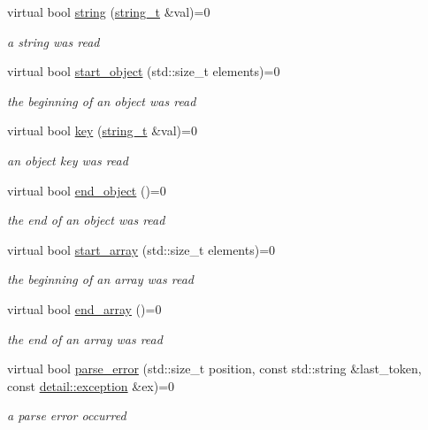 \begin{DoxyCompactItemize}
virtual bool \mbox{\hyperlink{structnlohmann_1_1json__sax_a07eab82f6c82d606787eee9ad73d2bda}{string}} (\mbox{\hyperlink{structnlohmann_1_1json__sax_ae01977a9f3c5b3667b7a2929ed91061e}{string\+\_\+t}} \&val)=0
\begin{DoxyCompactList}\small\item\em a string was read \end{DoxyCompactList}\item 
virtual bool \mbox{\hyperlink{structnlohmann_1_1json__sax_a0671528b0debb5a348169d61f0382a0f}{start\+\_\+object}} (std\+::size\+\_\+t elements)=0
\begin{DoxyCompactList}\small\item\em the beginning of an object was read \end{DoxyCompactList}\item 
virtual bool \mbox{\hyperlink{structnlohmann_1_1json__sax_a2e0c7ecd80b18d18a8cc76f71cfc2028}{key}} (\mbox{\hyperlink{structnlohmann_1_1json__sax_ae01977a9f3c5b3667b7a2929ed91061e}{string\+\_\+t}} \&val)=0
\begin{DoxyCompactList}\small\item\em an object key was read \end{DoxyCompactList}\item 
virtual bool \mbox{\hyperlink{structnlohmann_1_1json__sax_ad0c722d53ff97be700ccf6a9468bd456}{end\+\_\+object}} ()=0
\begin{DoxyCompactList}\small\item\em the end of an object was read \end{DoxyCompactList}\item 
virtual bool \mbox{\hyperlink{structnlohmann_1_1json__sax_a5c53878cf08d463eb4e7ca0270532572}{start\+\_\+array}} (std\+::size\+\_\+t elements)=0
\begin{DoxyCompactList}\small\item\em the beginning of an array was read \end{DoxyCompactList}\item 
virtual bool \mbox{\hyperlink{structnlohmann_1_1json__sax_a235ee975617f28e6a996d1e36a282312}{end\+\_\+array}} ()=0
\begin{DoxyCompactList}\small\item\em the end of an array was read \end{DoxyCompactList}\item 
virtual bool \mbox{\hyperlink{structnlohmann_1_1json__sax_a60287e3bd85f489e04c83f7e3b76e613}{parse\+\_\+error}} (std\+::size\+\_\+t position, const std\+::string \&last\+\_\+token, const \mbox{\hyperlink{classnlohmann_1_1detail_1_1exception}{detail\+::exception}} \&ex)=0
\begin{DoxyCompactList}\small\item\em a parse error occurred \end{DoxyCompactList}\end{DoxyCompactItemize}


